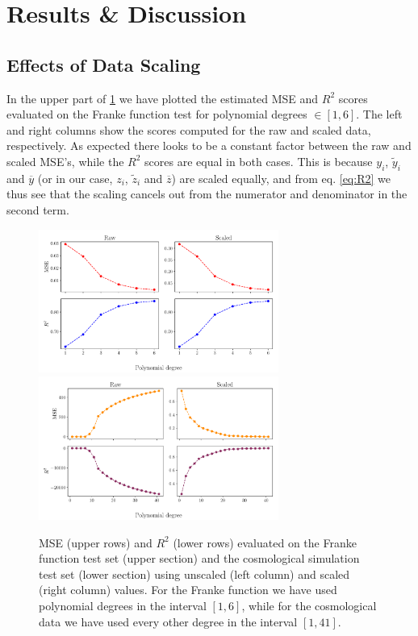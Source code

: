 \documentclass[aps,pra,english,notitlepage,reprint,nofootinbib]{revtex4-1}  %
\begin{document}
\section{Results \& Discussion}\label{sec:results discussion}
\subsection{Effects of Data Scaling}\label{subsec:scaling effect}
In the upper part of \cref{fig:error scaled vs raw} we have plotted the estimated MSE and $R^2$ scores evaluated on the Franke function test for polynomial degrees $\in[1,6]$. The left and right columns show the scores computed for the raw and scaled data, respectively. As expected there looks to be a constant factor between the raw and scaled MSE's, while the $R^2$ scores are equal in both cases. This is because $y_i$, $\tilde{y}_i$ and $\overline{y}$ (or in our case, $z_i$, $\tilde{z}_i$ and $\overline{z}$) are scaled equally, and from eq. \eqref{eq:R2} we thus see that the scaling cancels out from the numerator and denominator in the second term. 

\begin{figure}
  \vspace*{-5pt}
  \centering %
  \includegraphics[trim = 0 1.5cm 0 0,clip,width=0.7\textwidth,keepaspectratio]{../figs/a_error_scaled_vs_raw.pdf}
  \centering
  \includegraphics[width=0.7\textwidth]{../figs/g_error_scaled_vs_raw.pdf}
  \caption{MSE (upper rows) and $R^2$ (lower rows) evaluated on the Franke function test set (upper section) and the cosmological simulation test set (lower section) using unscaled (left column) and scaled (right column) values. For the Franke function we have used polynomial degrees in the interval $[1,6]$, while for the cosmological data we have used every other degree in the interval $[1,41]$.}\label{fig:error scaled vs raw}
  \vspace*{-5pt}
\end{figure}
\end{document}
